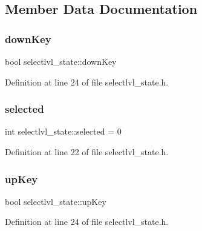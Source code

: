 \subsection{Member Data Documentation}
\hypertarget{classselectlvl__state_aef788a1fc2fa8b84eaace4cdc95dfee9}{}\label{classselectlvl__state_aef788a1fc2fa8b84eaace4cdc95dfee9} 
\subsubsection{\texorpdfstring{down\+Key}{downKey}}
{\footnotesize\ttfamily bool selectlvl\+\_\+state\+::down\+Key\hspace{0.3cm}{\ttfamily [protected]}}



Definition at line 24 of file selectlvl\+\_\+state.\+h.

\hypertarget{classselectlvl__state_a1aa7f8e42e33438122360815a25132fd}{}\label{classselectlvl__state_a1aa7f8e42e33438122360815a25132fd} 
\subsubsection{\texorpdfstring{selected}{selected}}
{\footnotesize\ttfamily int selectlvl\+\_\+state\+::selected = 0\hspace{0.3cm}{\ttfamily [protected]}}



Definition at line 22 of file selectlvl\+\_\+state.\+h.

\hypertarget{classselectlvl__state_aa4324e54a3512a3f62d19e9dc9edff3a}{}\label{classselectlvl__state_aa4324e54a3512a3f62d19e9dc9edff3a} 
\subsubsection{\texorpdfstring{up\+Key}{upKey}}
{\footnotesize\ttfamily bool selectlvl\+\_\+state\+::up\+Key\hspace{0.3cm}{\ttfamily [protected]}}



Definition at line 24 of file selectlvl\+\_\+state.\+h.

